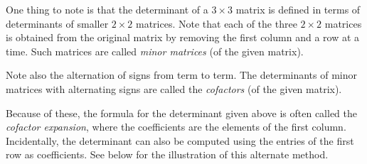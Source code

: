 \documentclass{ximera}
\begin{document}
One thing to note is that the determinant of a $3 \times 3$ matrix is
defined in terms of determinants of smaller $2 \times 2$ matrices. Note
that each of the three $2 \times 2$ matrices is obtained from the original
matrix by removing the first column and a row at a time. Such matrices
are called \textit{minor matrices} (of the given matrix).

Note also the alternation of signs from term to term. The determinants
of minor matrices with alternating signs are called the \textit{cofactors} (of
the given matrix).

Because of these, the formula for the determinant given above is often
called the \textit{cofactor expansion}, where the coefficients are the
elements of the first column. Incidentally, the determinant can also
be computed using the entries of the first row as coefficients. See
below for the illustration of this alternate method.
\end{document}
